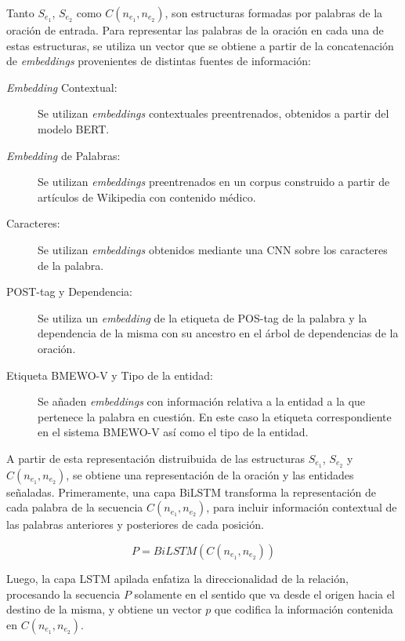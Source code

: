 Tanto $S_{e_1}$, $S_{e_2}$ como $C(n_{e_1}, n_{e_2})$, son estructuras formadas por palabras de la oración de entrada. Para representar las palabras de la oración en cada una de estas estructuras, se utiliza un vector que se obtiene a partir de la concatenación de \textit{embeddings} provenientes de distintas fuentes de información:

\begin{description}
	\item[\textit{Embedding} Contextual:] Se utilizan \textit{embeddings} contextuales preentrenados, obtenidos a partir del modelo BERT.
	
	\item[\textit{Embedding} de Palabras:] Se utilizan \textit{embeddings} preentrenados en un corpus construido a partir de artículos de Wikipedia con contenido médico.
	
	\item[Caracteres:] Se utilizan \textit{embeddings} obtenidos mediante una CNN sobre los caracteres de la palabra.
	
	\item[POST-tag y Dependencia:] Se utiliza un \textit{embedding} de la etiqueta de POS-tag de la palabra y la dependencia de la misma con su ancestro en el árbol de dependencias de la oración.
	
	\item[Etiqueta BMEWO-V y Tipo de la entidad:] Se añaden \textit{embeddings} con información relativa a la entidad a la que pertenece la palabra en cuestión.
	En este caso la etiqueta correspondiente en el sistema BMEWO-V así como el tipo de la entidad.
	
\end{description}

A partir de esta representación distruibuida de las estructuras $S_{e_1}$, $S_{e_2}$ y $C(n_{e_1}, n_{e_2})$, se obtiene una representación de la oración y las entidades señaladas.
Primeramente, una capa BiLSTM transforma la representación de cada palabra de la secuencia $C(n_{e_1}, n_{e_2})$, para incluir información contextual de las palabras anteriores y posteriores de cada posición.

\begin{equation*}
	P = BiLSTM(C(n_{e_1}, n_{e_2}))
\end{equation*}

Luego, la capa LSTM apilada enfatiza la direccionalidad de la relación, procesando la secuencia $P$ solamente en el sentido que va desde el origen hacia el destino de la misma, y obtiene un vector $p$ que codifica la información contenida en $C(n_{e_1}, n_{e_2})$.

